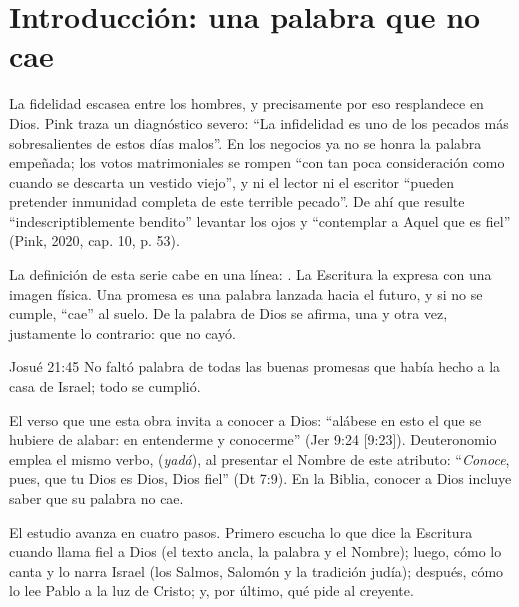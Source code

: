 
\section{Introducción: una palabra que no cae}

La fidelidad escasea entre los hombres, y precisamente por eso resplandece en Dios. Pink traza un diagnóstico severo: ``La infidelidad es uno de los pecados más sobresalientes de estos días malos''. En los negocios ya no se honra la palabra empeñada; los votos matrimoniales se rompen ``con tan poca consideración como cuando se descarta un vestido viejo'', y ni el lector ni el escritor ``pueden pretender inmunidad completa de este terrible pecado''. De ahí que resulte ``indescriptiblemente bendito'' levantar los ojos y ``contemplar a Aquel que es fiel'' (Pink, 2020, cap. 10, p. 53).

La definición de esta serie cabe en una línea: . La Escritura la expresa con una imagen física. Una promesa es una palabra lanzada hacia el futuro, y si no se cumple, ``cae'' al suelo. De la palabra de Dios se afirma, una y otra vez, justamente lo contrario: que no cayó.

\begin{verso}{Josué 21:45}
No faltó palabra de todas las buenas promesas que \SENOR{} había hecho a la casa de Israel; todo se cumplió.
\end{verso}

El verso que une esta obra invita a conocer a Dios: ``alábese en esto el que se hubiere de alabar: en entenderme y conocerme'' (Jer 9:24 [9:23]). Deuteronomio emplea el mismo verbo,  (\emph{yadá}), al presentar el Nombre de este atributo: ``\emph{Conoce}, pues, que \SENOR{} tu Dios es Dios, Dios fiel'' (Dt 7:9). En la Biblia, conocer a Dios incluye saber que su palabra no cae.

El estudio avanza en cuatro pasos. Primero escucha lo que dice la Escritura cuando llama fiel a Dios (el texto ancla, la palabra y el Nombre); luego, cómo lo canta y lo narra Israel (los Salmos, Salomón y la tradición judía); después, cómo lo lee Pablo a la luz de Cristo; y, por último, qué pide al creyente.

